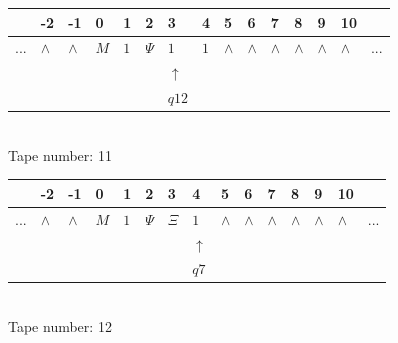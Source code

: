 \documentclass[11pt]{article}
\begin{document}
\begin{table}[H]
\centering
\begin{tabular}{lllllllllllllll}
 & -2 & -1 & 0 & 1 & 2 & 3 & 4 & 5 & 6 & 7 & 8 & 9 & 10 & \\
\hline
$...$ & \multicolumn{1}{|l|}{$\wedge$} & \multicolumn{1}{|l|}{$\wedge$} & \multicolumn{1}{|l|}{$M$} & \multicolumn{1}{|l|}{$1$} & \multicolumn{1}{|l|}{$\Psi$} & \multicolumn{1}{|l|}{$1$} & \multicolumn{1}{|l|}{$1$} & \multicolumn{1}{|l|}{$\wedge$} & \multicolumn{1}{|l|}{$\wedge$} & \multicolumn{1}{|l|}{$\wedge$} & \multicolumn{1}{|l|}{$\wedge$} & \multicolumn{1}{|l|}{$\wedge$} & \multicolumn{1}{|l|}{$\wedge$} & $...$\\
\hline
&  &  &  &  &  & $\uparrow$ &  &  &  &  &  &  &  &  \\
&  &  &  &  &  & $ q12 $ &  &  &  &  &  &  &  &  \\
\end{tabular}
\\
Tape number: 11
\noindent\makebox[\linewidth]{\hdashrule{\textwidth}{1pt}{1pt}}\end{table}
\clearpage

\begin{table}[H]
\centering
\begin{tabular}{lllllllllllllll}
 & -2 & -1 & 0 & 1 & 2 & 3 & 4 & 5 & 6 & 7 & 8 & 9 & 10 & \\
\hline
$...$ & \multicolumn{1}{|l|}{$\wedge$} & \multicolumn{1}{|l|}{$\wedge$} & \multicolumn{1}{|l|}{$M$} & \multicolumn{1}{|l|}{$1$} & \multicolumn{1}{|l|}{$\Psi$} & \multicolumn{1}{|l|}{$\Xi$} & \multicolumn{1}{|l|}{$1$} & \multicolumn{1}{|l|}{$\wedge$} & \multicolumn{1}{|l|}{$\wedge$} & \multicolumn{1}{|l|}{$\wedge$} & \multicolumn{1}{|l|}{$\wedge$} & \multicolumn{1}{|l|}{$\wedge$} & \multicolumn{1}{|l|}{$\wedge$} & $...$\\
\hline
&  &  &  &  &  &  & $\uparrow$ &  &  &  &  &  &  &  \\
&  &  &  &  &  &  & $ q7 $ &  &  &  &  &  &  &  \\
\end{tabular}
\\
Tape number: 12
\noindent\makebox[\linewidth]{\hdashrule{\textwidth}{1pt}{1pt}}\end{table}
\end{document}
